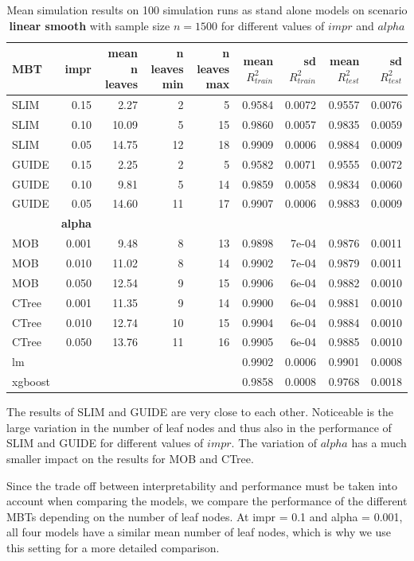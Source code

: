 \begin{table}[!htb] 
\caption{Mean simulation results on 100 simulation runs as stand alone models on scenario \textbf{linear smooth} with sample size $n = 1500$ for different values of $impr$ and $alpha$}
\centering \tiny
\begin{tabular}[t]{l|r|r|r|r|r|r|r|r}
\hline
MBT & \textbf{impr} & mean n leaves & n leaves min & n leaves max & mean $R^2_{train}$ & sd $R^2_{train}$ & mean $R^2_{test}$ & sd $R^2_{test}$\\
\hline
SLIM & 0.15 & 2.27 & 2 & 5 & 0.9584 & 0.0072 & 0.9557 & 0.0076\\
SLIM & 0.10 & 10.09 & 5 & 15 & 0.9860 & 0.0057 & 0.9835 & 0.0059\\
SLIM & 0.05 & 14.75 & 12 & 18 & 0.9909 & 0.0006 & 0.9884 & 0.0009\\
GUIDE & 0.15 & 2.25 & 2 & 5 & 0.9582 & 0.0071 & 0.9555 & 0.0072\\
GUIDE & 0.10 & 9.81 & 5 & 14 & 0.9859 & 0.0058 & 0.9834 & 0.0060\\
GUIDE & 0.05 & 14.60 & 11 & 17 & 0.9907 & 0.0006 & 0.9883 & 0.0009\\
\hline
 & \textbf{alpha} &  &  &  &  &  &  & \\
\hline
MOB & 0.001 & 9.48 & 8 & 13 & 0.9898 & 7e-04 & 0.9876 & 0.0011\\
MOB & 0.010 & 11.02 & 8 & 14 & 0.9902 & 7e-04 & 0.9879 & 0.0011\\
MOB & 0.050 & 12.54 & 9 & 15 & 0.9906 & 6e-04 & 0.9882 & 0.0010\\
CTree & 0.001 & 11.35 & 9 & 14 & 0.9900 & 6e-04 & 0.9881 & 0.0010\\
CTree & 0.010 & 12.74 & 10 & 15 & 0.9904 & 6e-04 & 0.9884 & 0.0010\\
CTree & 0.050 & 13.76 & 11 & 16 & 0.9905 & 6e-04 & 0.9885 & 0.0010\\
\hline
lm & & & & & 0.9902 & 0.0006 & 0.9901 & 0.0008\\
xgboost & & & & & 0.9858 & 0.0008 & 0.9768 & 0.0018\\
\hline
\end{tabular}
\label{tab:linear_smooth_summary}
\end{table}
The results of SLIM and GUIDE are very close to each other. Noticeable is the large variation in the number of leaf nodes and thus also in the performance of SLIM and GUIDE for different values of $impr$. The variation of $alpha$ has a much smaller impact on the results for MOB and CTree.

Since the trade off between interpretability and performance must be taken into account when comparing the models, we compare the performance of the different MBTs depending on the number of leaf nodes. 
At impr = 0.1 and alpha = 0.001, all four models have a similar mean number of leaf nodes, which is why we use this setting for a more detailed comparison.

